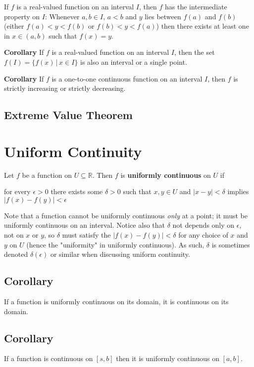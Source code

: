 \documentclass[12pt]{article}
\newcommand{\R}{\mathbb{R}}
\begin{document}
If $f$ is a real-valued function on an interval $I$, then $f$ has the intermediate property on $I$: Whenever $a, b \in I$, $a < b$ and $y$ lies between $f(a)$ and $f(b)$ (either $f(a) < y < f(b)$ or $f(b) < y < f(a)$) then there exists at least one in $x \in (a,b)$ such that $f(x) = y$.

\textbf{Corollary} If $f$ is a real-valued function on an interval $I$, then the set $f(I) = \{ f(x) \, | \, x \in I \}$ is also an interval or a single point.

\textbf{Corollary} If $f$ is a one-to-one continuous function on an interval $I$, then $f$ is strictly increasing or strictly decreasing.

\subsection{Extreme Value Theorem}

\section{Uniform Continuity}

Let $f$ be a function on $U \subseteq \R$. Then $f$ is \textbf{uniformly continuous} on $U$ if \begin{center} for every $\epsilon > 0$ there exists some $\delta > 0$ such that $x,y \in U$ and $|x - y| < \delta$ implies $|f(x) - f(y)| < \epsilon$ \end{center} Note that a function cannot be uniformly continuous \textit{only} at a point; it must be uniformly continuous on an interval. Notice also that $\delta$ not depends only on $\epsilon$, not on $x$ or $y$, so $\delta$ must satisfy the $|f(x) - f(y)| < \delta$ for any choice of $x$ and $y$ on $U$ (hence the "uniformity" in uniformly continuous). As such, $\delta$ is sometimes denoted $\delta(\epsilon)$ or similar when discussing uniform continuity.

\subsection{Corollary} If a function is uniformly continuous on its domain, it is continuous on its domain.

\subsection{Corollary} If a function is continuous on $[s,b]$ then it is uniformly continuous on $[a,b]$.
\end{document}
